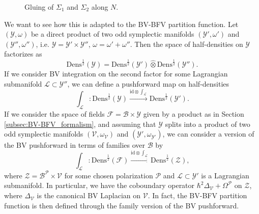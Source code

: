\documentclass[11pt,colorinlistoftodos]{amsart}
\numberwithin{equation}{subsection}
\theoremstyle{plain}
\theoremstyle{definition}
\theoremstyle{remark}
\newcommand{\calY}{\mathcal{Y}}
\newcommand{\id}{\mathrm{id}}
\newcommand{\calB}{\mathcal{B}}
\newcommand{\calL}{\mathcal{L}}
\newcommand{\calP}{\mathcal{P}}
\newcommand{\calF}{\mathcal{F}}
\newcommand{\calV}{\mathcal{V}}
\begin{document}
\begin{figure}[h!]
    \centering
    \caption{Gluing of $\Sigma_1$ and $\Sigma_2$ along $N$.}
    \label{fig:gluing_1}
\end{figure}

We want to see how this is adapted to the BV-BFV partition function.
Let $(\calY,\omega)$ be a direct product of two odd symplectic manifolds $(\calY',\omega')$ and $(\calY'',\omega'')$, i.e. $\calY=\calY'\times\calY''$, $\omega=\omega'+\omega''$. Then the space of half-densities on $\calY$ factorizes as 
\[
\mathrm{Dens}^\frac{1}{2}(\calY)=\mathrm{Dens}^\frac{1}{2}(\calY')\widehat{\otimes}\mathrm{Dens}^\frac{1}{2}(\calY''). 
\]
If we consider BV integration on the second factor for some Lagrangian submanifold $\calL\subset \calY''$, we can define a pushforward map on half-densities
\[
\int_\calL\colon \mathrm{Dens}^\frac{1}{2}(\calY)\xrightarrow{\id\otimes \int_\calL}\mathrm{Dens}^\frac{1}{2}(\calY').
\]
If we consider the space of fields $\calF=\calB\times\calY$ given by a product as in Section \ref{subsec:BV-BFV_formalism}, and assuming that $\calY$ splits into a product of two odd symplectic manifolds $(\calV,\omega_\calV)$ and $(\calY',\omega_{\calY'})$, we can consider a version of the BV pushforward in terms of families over $\calB$ by 
\[
\int_\calL\colon \mathrm{Dens}^\frac{1}{2}(\calF)\xrightarrow{\id\otimes \int_\calL}\mathrm{Dens}^\frac{1}{2}(\mathcal{Z}),
\]
where $\mathcal{Z}=\calB^\calP\times\calV$ for some chosen polarization $\calP$ and $\calL\subset \calY'$ is a Lagrangian submanifold. In particular, we have the coboundary operator $\hbar^2\Delta_\calV+\Omega^\calP$ on $\mathcal{Z}$, where $\Delta_\calV$ is the canonical BV Laplacian on $\calV$. In fact, the BV-BFV partition function is then defined through the family version of the BV pushforward. 
\end{document}
